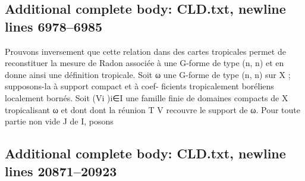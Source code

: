 \documentclass[
  10pt,
]{article}
\newenvironment{Shaded}{}{}
\newcommand{\NormalTok}[1]{#1}
\begin{document}
\subsection{Additional complete body: CLD.txt, newline lines
6978--6985}\label{additional-complete-body-cld.txt-newline-lines-69786985}

\begin{Shaded}
\begin{Highlighting}[]
\NormalTok{Prouvons inversement que cette relation dans des cartes tropicales permet de reconstituer}
\NormalTok{la mesure de Radon associée à une G{-}forme de type (n, n) et en donne ainsi une définition}
\NormalTok{tropicale.}
\NormalTok{   Soit ω une G{-}forme de type (n, n) sur X ; supposons{-}la à support compact et à coef{-}}
\NormalTok{ficients tropicalement boréliens localement bornés.}
\NormalTok{   Soit (Vi )i∈I une famille finie de domaines compacts de X tropicalisant ω et dont dont}
\NormalTok{la réunion}
\NormalTok{      T       V recouvre le support de ω. Pour toute partie non vide J de I, posons}
\end{Highlighting}
\end{Shaded}

\subsection{Additional complete body: CLD.txt, newline lines
20871--20923}\label{additional-complete-body-cld.txt-newline-lines-2087120923}
\end{document}
